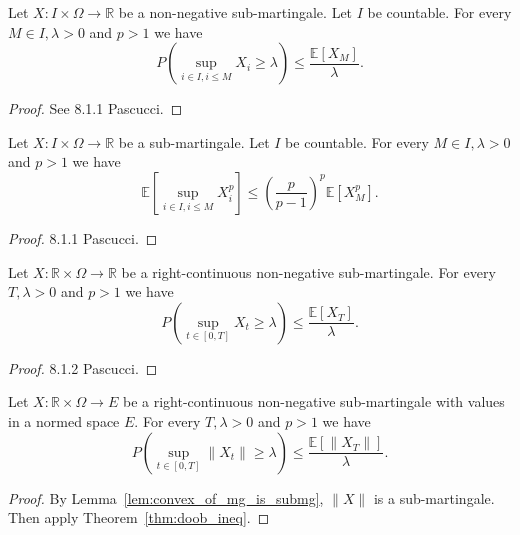 \begin{lemma}\label{lem:doob_countable}
  Let $X:I\times\Omega\rightarrow \mathbb{R}$ be a non-negative sub-martingale.  Let $I$ be countable.
  For every $M\in I,\lambda > 0$ and $p>1$ we have
  $$
  P\left( \sup_{i\in I, i\leq M}X_i\geq\lambda \right)\leq \frac{\mathbb{E}[X_M]}{\lambda}.
  $$
\end{lemma}
\begin{proof}
  See 8.1.1 Pascucci.
\end{proof}

\begin{lemma}\label{lem:doob_countable_cor}
  Let $X:I\times\Omega\rightarrow \mathbb{R}$ be a sub-martingale. Let $I$ be countable.
  For every $M\in I,\lambda > 0$ and $p>1$ we have
  $$
  \mathbb{E}\left[ \sup_{i\in I, i\leq M}X_i^p \right]\leq \left(\frac{p}{p-1}\right)^p\mathbb{E}[X_M^p].
  $$
\end{lemma}
\begin{proof}
  8.1.1 Pascucci.
\end{proof}

\begin{theorem}\label{thm:doob_ineq}
  Let $X:\mathbb{R}\times\Omega\rightarrow \mathbb{R}$ be a right-continuous non-negative sub-martingale.
  For every $T, \lambda>0$ and $p>1$ we have
  $$
  P\left( \sup_{t\in[0,T]}X_t\geq\lambda \right)\leq \frac{\mathbb{E}[X_T]}{\lambda}.
  $$
\end{theorem}
\begin{proof}
  8.1.2 Pascucci.
\end{proof}

\begin{corollary}\label{cor:doob_ineq}
  Let $X:\mathbb{R}\times\Omega\rightarrow E$ be a right-continuous non-negative sub-martingale with values in a normed space $E$.
  For every $T, \lambda>0$ and $p>1$ we have
  $$
  P\left( \sup_{t\in[0,T]} \lVert X_t \rVert \geq \lambda \right) \leq \frac{\mathbb{E}[\lVert X_T \rVert]}{\lambda}.
  $$
\end{corollary}
\begin{proof}
  By Lemma~\ref{lem:convex_of_mg_is_submg}, $\lVert X \rVert$ is a sub-martingale.
  Then apply Theorem~\ref{thm:doob_ineq}.
\end{proof}

